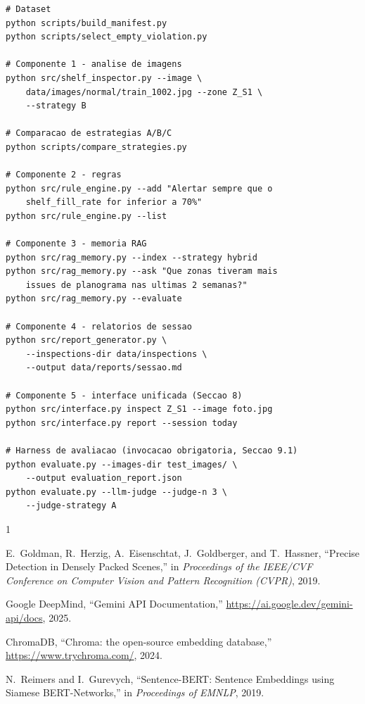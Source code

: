 \documentclass[conference]{IEEEtran}
\begin{document}
\begin{lstlisting}
# Dataset
python scripts/build_manifest.py
python scripts/select_empty_violation.py

# Componente 1 - analise de imagens
python src/shelf_inspector.py --image \
    data/images/normal/train_1002.jpg --zone Z_S1 \
    --strategy B

# Comparacao de estrategias A/B/C
python scripts/compare_strategies.py

# Componente 2 - regras
python src/rule_engine.py --add "Alertar sempre que o
    shelf_fill_rate for inferior a 70%"
python src/rule_engine.py --list

# Componente 3 - memoria RAG
python src/rag_memory.py --index --strategy hybrid
python src/rag_memory.py --ask "Que zonas tiveram mais
    issues de planograma nas ultimas 2 semanas?"
python src/rag_memory.py --evaluate

# Componente 4 - relatorios de sessao
python src/report_generator.py \
    --inspections-dir data/inspections \
    --output data/reports/sessao.md

# Componente 5 - interface unificada (Seccao 8)
python src/interface.py inspect Z_S1 --image foto.jpg
python src/interface.py report --session today

# Harness de avaliacao (invocacao obrigatoria, Seccao 9.1)
python evaluate.py --images-dir test_images/ \
    --output evaluation_report.json
python evaluate.py --llm-judge --judge-n 3 \
    --judge-strategy A
\end{lstlisting}

\begin{thebibliography}{1}

\bibitem{sku110k}
E.~Goldman, R.~Herzig, A.~Eisenschtat, J.~Goldberger, and T.~Hassner,
``Precise Detection in Densely Packed Scenes,'' in \textit{Proceedings of
the IEEE/CVF Conference on Computer Vision and Pattern Recognition (CVPR)},
2019.

\bibitem{gemini}
Google DeepMind, ``Gemini API Documentation,'' \url{https://ai.google.dev/gemini-api/docs}, 2025.

\bibitem{chromadb}
ChromaDB, ``Chroma: the open-source embedding database,'' \url{https://www.trychroma.com/}, 2024.

\bibitem{sbert}
N.~Reimers and I.~Gurevych, ``Sentence-BERT: Sentence Embeddings using
Siamese BERT-Networks,'' in \textit{Proceedings of EMNLP}, 2019.

\end{thebibliography}
\end{document}
